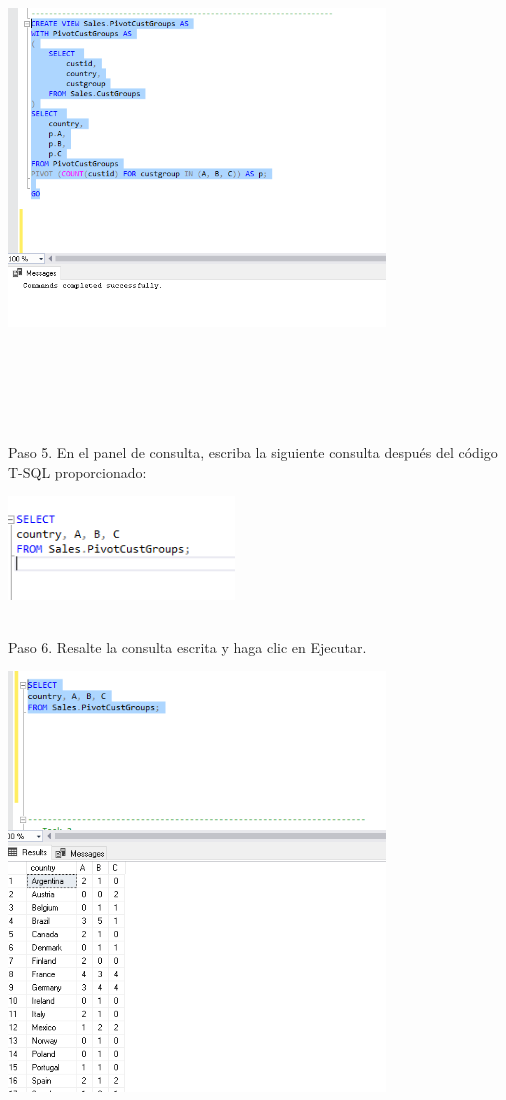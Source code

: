 \begin{flushleft}
\begin{center}
	\includegraphics[width=10cm]{./Imagenes/5img2} 
\end{center}
\textbf{}\\
\textbf{}\\
\textbf{}\\
\textbf{}\\
\textbf{}\\
Paso 5. En el panel de consulta, escriba la siguiente consulta después del código T-SQL proporcionado:
\begin{center}
	\includegraphics[width=6cm]{./Imagenes/5img3} 
\end{center}
\textbf{}\\
Paso 6. Resalte la consulta escrita y haga clic en Ejecutar.
\begin{center}
	\includegraphics[width=10cm]{./Imagenes/5img4} 

\end{center}
\end{flushleft}
